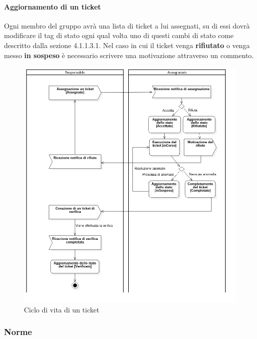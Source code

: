 	\paragraph{Aggiornamento di un ticket}
	Ogni membro del gruppo avrà una lista di ticket a lui assegnati, su di essi dovrà modificare il tag di stato ogni qual volta uno di questi cambi di stato come descritto dalla sezione 4.1.1.3.1. Nel caso in cui il ticket venga \textbf{rifiutato} o venga messo \textbf{in sospeso} è necessario scrivere una motivazione attraverso un commento.
	\begin{figure}
		\includegraphics[scale=.53]{img/vitaTicket.png}
		\centering
		\caption{Ciclo di vita di un ticket}
	\end{figure}
\subsubsection{Norme}
